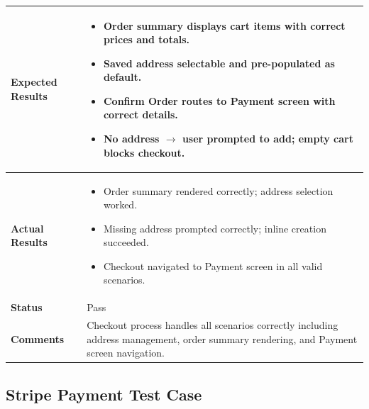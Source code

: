 \begin{table}[H]
\begin{tabular}{|p{3.2cm}|p{10.8cm}|}
\textbf{Expected Results} &
\begin{itemize}[leftmargin=*,noitemsep]
\item Order summary displays cart items with correct prices and totals.
\item Saved address selectable and pre-populated as default.
\item Confirm Order routes to Payment screen with correct details.
\item No address $\rightarrow$ user prompted to add; empty cart blocks checkout.
\end{itemize} \\ \hline
\textbf{Actual Results} &
\begin{itemize}[leftmargin=*,noitemsep]
\item Order summary rendered correctly; address selection worked.
\item Missing address prompted correctly; inline creation succeeded.
\item Checkout navigated to Payment screen in all valid scenarios.
\end{itemize} \\ \hline
\textbf{Status} & Pass \\ \hline
\textbf{Comments} & Checkout process handles all scenarios correctly including address management, order summary rendering, and Payment screen navigation. \\ \hline
\end{tabular}
\end{table}

\subsection{Stripe Payment Test Case}


